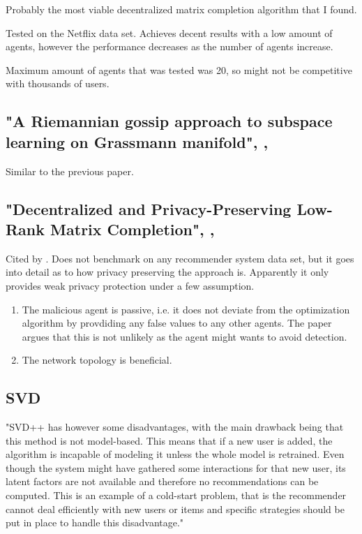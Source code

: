Probably the most viable decentralized matrix completion algorithm that I found.

Tested on the Netflix data set. Achieves decent results with a low amount of agents, however the performance decreases as the number of agents increase.

Maximum amount of agents that was tested was 20, so might not be competitive with thousands of users.

\subsection{"A Riemannian gossip approach to subspace learning on Grassmann manifold", \citeyear{mishra2018riemannian}, \cite{mishra2018riemannian}}
\label{sec:mishra2018riemannian}

Similar to the previous paper.

\subsection{"Decentralized and Privacy-Preserving Low-Rank Matrix Completion", \citeyear{Lin2015}, \cite{Lin2015}}
\label{sec:Lin2015}

Cited by \cite{mishra2018riemannian}. Does not benchmark on any recommender system data set, but it goes into detail as to how privacy preserving the approach is. Apparently it only provides weak privacy protection under a few assumption.

\begin{enumerate}
    \item The malicious agent is passive, i.e. it does not deviate from the optimization algorithm by provdiding any false values to any other agents. The paper argues that this is not unlikely as the agent might wants to avoid detection.
    \item The network topology is beneficial.
\end{enumerate}

\subsection{SVD}

"SVD++ has however some disadvantages, with the main drawback being that this method is not model-based. This means that if a new user is added, the algorithm is incapable of modeling it unless the whole model is retrained. Even though the system might have gathered some interactions for that new user, its latent factors are not available and therefore no recommendations can be computed. This is an example of a cold-start problem, that is the recommender cannot deal efficiently with new users or items and specific strategies should be put in place to handle this disadvantage."


